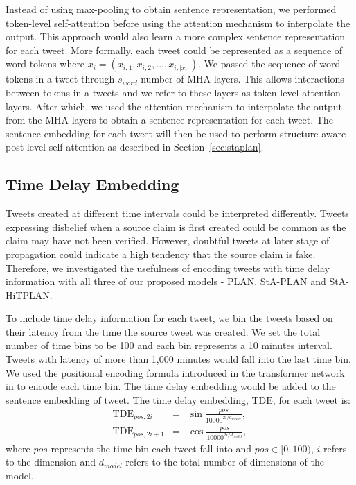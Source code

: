 \documentclass[letterpaper]{article} %
\begin{document}
Instead of using max-pooling to obtain sentence representation, we performed token-level self-attention before using the attention mechanism to interpolate the output. This approach would also learn a more complex sentence representation for each tweet. More formally, each tweet could be represented as a sequence of word tokens where  $x_{i} = (x_{i,1}, x_{i,2}, ..., x_{i,|x_i|})$. We passed the sequence of word tokens in a tweet through $s_{word}$ number of MHA layers. This allows interactions between tokens in a tweets and we refer to these layers as token-level attention layers. After which, we used the attention mechanism to interpolate the output from the MHA layers to obtain a sentence representation for each tweet. The sentence embedding for each tweet will then be used to perform structure aware post-level self-attention as described in Section~\ref{sec:staplan}.

\subsection{Time Delay Embedding}
\label{sec:timedelay}
Tweets created at different time intervals could be interpreted differently. Tweets expressing disbelief when a source claim is first created could be common as the claim may have not been verified. However, doubtful tweets at later stage of propagation could indicate a high tendency that the source claim is fake. Therefore, we investigated the usefulness of encoding tweets with time delay information with all three of our proposed models - PLAN, StA-PLAN and StA-HiTPLAN.

To include time delay information for each tweet, we bin the tweets based on their latency from the time the source tweet was created. We set the total number of time bins to be 100 and each bin represents a 10 minutes interval. Tweets with latency of more than 1,000 minutes would fall into the last time bin.
We used the positional encoding formula introduced in the transformer network in \citet{DBLP:journals/corr/VaswaniSPUJGKP17} to encode each time bin. The time delay embedding would be added to the sentence embedding of tweet. The time delay embedding, $\mathrm{TDE}$, for each tweet is:
\begin{eqnarray}
\mathrm{TDE}_{pos,2i} &=& \sin \frac{pos}{10000^{2i/d_{model}}}, \\
\mathrm{TDE}_{pos,2i+1} &=& \cos \frac{pos}{10000^{2i/d_{model}}},
\end{eqnarray}
where $pos$ represents the time bin each tweet fall into and $pos \in [0,100)$, $i$ refers to the dimension and $d_{model}$ refers to the total number of dimensions of the model.
\newcommand{\tabitem}{~~\llap{\textbullet}~~}
\end{document}
